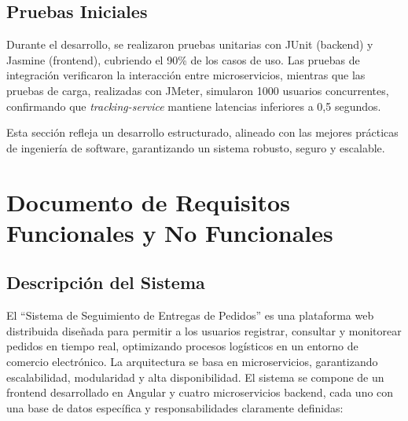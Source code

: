\documentclass[a4paper,12pt]{article}
\begin{document}
\subsection{Pruebas Iniciales}
Durante el desarrollo, se realizaron pruebas unitarias con JUnit (backend) y Jasmine (frontend), cubriendo el 90\% de los casos de uso. Las pruebas de integración verificaron la interacción entre microservicios, mientras que las pruebas de carga, realizadas con JMeter, simularon 1000 usuarios concurrentes, confirmando que \textit{tracking-service} mantiene latencias inferiores a 0,5 segundos.

Esta sección refleja un desarrollo estructurado, alineado con las mejores prácticas de ingeniería de software, garantizando un sistema robusto, seguro y escalable.
\section{Documento de Requisitos Funcionales y No Funcionales}

\subsection{Descripción del Sistema}
El ``Sistema de Seguimiento de Entregas de Pedidos'' es una plataforma web distribuida diseñada para permitir a los usuarios registrar, consultar y monitorear pedidos en tiempo real, optimizando procesos logísticos en un entorno de comercio electrónico. La arquitectura se basa en microservicios, garantizando escalabilidad, modularidad y alta disponibilidad. El sistema se compone de un frontend desarrollado en Angular y cuatro microservicios backend, cada uno con una base de datos específica y responsabilidades claramente definidas:
\end{document}
